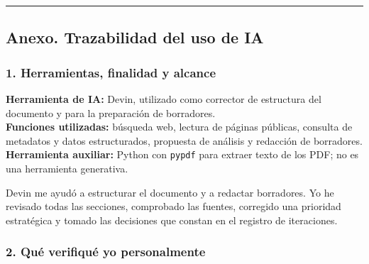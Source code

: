 \documentclass[
]{article}
\begin{document}
\begin{center}\rule{0.5\linewidth}{0.5pt}\end{center}

\hypertarget{anexo.-trazabilidad-del-uso-de-ia}{%
\subsection{Anexo. Trazabilidad del uso de
IA}\label{anexo.-trazabilidad-del-uso-de-ia}}

\hypertarget{herramientas-finalidad-y-alcance}{%
\subsubsection{1. Herramientas, finalidad y
alcance}\label{herramientas-finalidad-y-alcance}}

\textbf{Herramienta de IA:} Devin, utilizado como corrector de
estructura del documento y para la preparación de borradores.\\
\textbf{Funciones utilizadas:} búsqueda web, lectura de páginas
públicas, consulta de metadatos y datos estructurados, propuesta de
análisis y redacción de borradores.\\
\textbf{Herramienta auxiliar:} Python con \texttt{pypdf} para extraer
texto de los PDF; no es una herramienta generativa.

Devin me ayudó a estructurar el documento y a redactar borradores. Yo he
revisado todas las secciones, comprobado las fuentes, corregido una
prioridad estratégica y tomado las decisiones que constan en el registro
de iteraciones.

\hypertarget{quuxe9-verifiquuxe9-yo-personalmente}{%
\subsubsection{2. Qué verifiqué yo
personalmente}\label{quuxe9-verifiquuxe9-yo-personalmente}}
\end{document}
